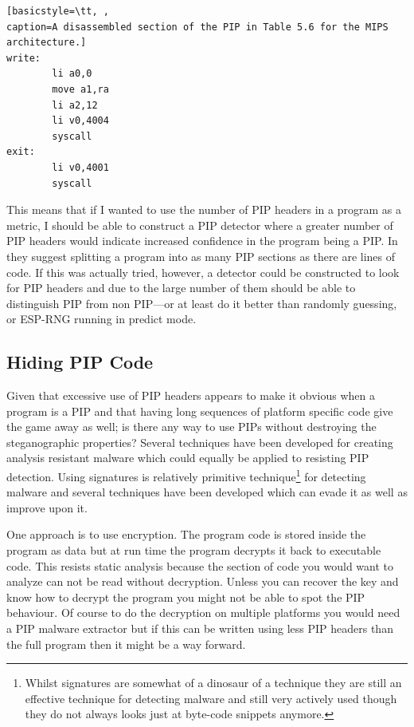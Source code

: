 \documentclass[10pt,]{book}
\begin{document}
\begin{lstlisting}[basicstyle=\tt, ,
caption=A disassembled section of the PIP in Table 5.6 for the MIPS architecture.]
write:
        li a0,0
        move a1,ra
        li a2,12
        li v0,4004
        syscall
exit:
        li v0,4001
        syscall
\end{lstlisting}
This means that if I wanted to use the number of PIP headers in a
program as a metric, I should be able to construct a PIP detector where
a greater number of PIP headers would indicate increased confidence in
the program being a PIP. In \autocite{Cha:2010uh} they suggest splitting
a program into as many PIP sections as there are lines of code. If this
was actually tried, however, a detector could be constructed to look for
PIP headers and due to the large number of them should be able to
distinguish PIP from non PIP---or at least do it better than randomly
guessing, or ESP-RNG running in predict mode\autocite{Birkett:vw}.

\subsection{Hiding PIP Code}

Given that excessive use of PIP headers appears to make it obvious when
a program is a PIP and that having long sequences of platform specific
code give the game away as well; is there any way to use PIPs without
destroying the steganographic properties? Several techniques have been
developed for creating analysis resistant
malware\autocite{Bethencourt:2008ug} which could equally be applied to
resisting PIP detection. Using signatures is relatively primitive
technique\footnote{Whilst signatures are somewhat of a
  dinosaur\autocite{Lull:1910tz} of a technique they are still an
  effective technique for detecting malware and still very actively used
  though they do not always looks just at byte-code snippets
  anymore.\autocite{Acosta:wz}\autocite{Liang:2011va}} for detecting
malware\autocite{Zhang:2007jy} and several techniques have been
developed which can evade it as well as improve upon it.

One approach is to use encryption. The program code is stored inside the
program as data but at run time the program decrypts it back to
executable code\autocite{Royal:2006ug}. This resists static analysis
because the section of code you would want to analyze can not be read
without decryption. Unless you can recover the key and know how to
decrypt the program you might not be able to spot the PIP behaviour. Of
course to do the decryption on multiple platforms you would need a PIP
malware extractor but if this can be written using less PIP headers than
the full program then it might be a way forward.
\end{document}
